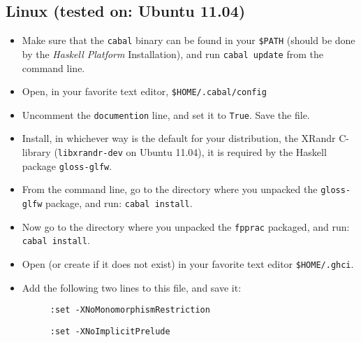 \documentclass[]{article}
\begin{document}
\subsection{Linux (tested on: Ubuntu 11.04)}
\begin{itemize}
  \item Make sure that the \texttt{cabal} binary can be found in your \texttt{\$PATH} (should be done by the \emph{Haskell Platform} Installation), and run \texttt{cabal update} from the command line.
  \item Open, in your favorite text editor, \texttt{\$HOME/.cabal/config}
  \item Uncomment the \texttt{documention} line, and set it to \texttt{True}. Save the file.
  \item Install, in whichever way is the default for your distribution, the XRandr C-library (\texttt{libxrandr-dev} on Ubuntu 11.04), it is required by the Haskell package \texttt{gloss-glfw}.
  \item From the command line, go to the directory where you unpacked the \texttt{gloss-glfw} package, and run: \texttt{cabal install}.
  \item Now go to the directory where you unpacked the \texttt{fpprac} packaged, and run: \texttt{cabal install}.
  \item Open (or create if it does not exist) in your favorite text editor \texttt{\$HOME/.ghci}.
  \item Add the following two lines to this file, and save it:
  \begin{description}
    \item[] \texttt{:set -XNoMonomorphismRestriction}
    \item[] \texttt{:set -XNoImplicitPrelude}
  \end{description}
\end{itemize}
\end{document}
